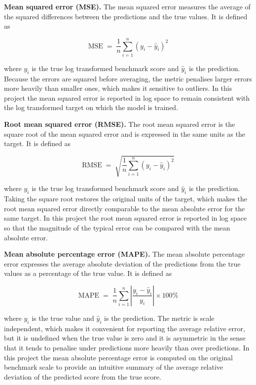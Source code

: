 \documentclass[12pt, a4paper]{report}
\numberwithin{figure}{chapter}
\numberwithin{table}{chapter}
\numberwithin{equation}{chapter}
\begin{document}
\textbf{Mean squared error (MSE).} The mean squared error measures the average of the squared differences between the predictions and the true values. It is defined as

\begin{equation}
\text{MSE} \;=\; \frac{1}{n} \sum_{i=1}^{n} \left( y_i - \hat{y}_i \right)^{2}
\label{eq:mse}
\end{equation}

\noindent where $y_i$ is the true log transformed benchmark score and $\hat{y}_i$ is the prediction. Because the errors are squared before averaging, the metric penalises larger errors more heavily than smaller ones, which makes it sensitive to outliers. In this project the mean squared error is reported in log space to remain consistent with the log transformed target on which the model is trained.

\textbf{Root mean squared error (RMSE).} The root mean squared error is the square root of the mean squared error and is expressed in the same units as the target. It is defined as

\begin{equation}
\text{RMSE} \;=\; \sqrt{\frac{1}{n} \sum_{i=1}^{n} \left( y_i - \hat{y}_i \right)^{2}}
\label{eq:rmse}
\end{equation}

\noindent where $y_i$ is the true log transformed benchmark score and $\hat{y}_i$ is the prediction. Taking the square root restores the original units of the target, which makes the root mean squared error directly comparable to the mean absolute error for the same target. In this project the root mean squared error is reported in log space so that the magnitude of the typical error can be compared with the mean absolute error.

\textbf{Mean absolute percentage error (MAPE).} The mean absolute percentage error expresses the average absolute deviation of the predictions from the true values as a percentage of the true value. It is defined as

\begin{equation}
\text{MAPE} \;=\; \frac{1}{n} \sum_{i=1}^{n} \left| \frac{y_i - \hat{y}_i}{y_i} \right| \times 100\%
\label{eq:mape}
\end{equation}

\noindent where $y_i$ is the true value and $\hat{y}_i$ is the prediction. The metric is scale independent, which makes it convenient for reporting the average relative error, but it is undefined when the true value is zero and it is asymmetric in the sense that it tends to penalise under predictions more heavily than over predictions. In this project the mean absolute percentage error is computed on the original benchmark scale to provide an intuitive summary of the average relative deviation of the predicted score from the true score.
\end{document}
